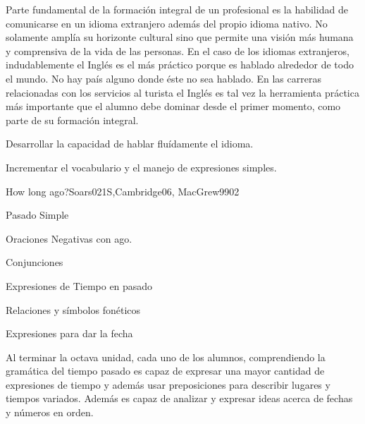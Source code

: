 \begin{syllabus}


\begin{justification}
Parte fundamental de la formación integral de un profesional es la habilidad de 
comunicarse en un idioma extranjero además del propio idioma nativo. No solamente 
amplía su horizonte cultural sino que permite una visión más humana y comprensiva 
de la vida de las personas. En el caso de los idiomas extranjeros, indudablemente 
el Inglés es el más práctico porque es hablado alrededor de todo el mundo. No hay 
país alguno donde éste no sea hablado. En las carreras relacionadas con los 
servicios al turista el Inglés es tal vez la herramienta práctica más importante 
que el alumno debe dominar desde el primer momento, como parte de su formación 
integral.
\end{justification}

\begin{goals}
    \item Desarrollar la capacidad de hablar fluídamente el idioma.
    \item Incrementar el vocabulario y el manejo de expresiones simples.
\end{goals}

\begin{outcomes}
    \item {}
\end{outcomes}

\begin{competences}
    \item {}
\end{competences}

\begin{unit}{How long ago?}{}{Soars021S,Cambridge06, MacGrew99}{0}{2}
   \begin{topics}
      \item Pasado Simple
      \item Oraciones Negativas con ago.
      \item Conjunciones
      \item Expresiones de Tiempo en pasado
      \item Relaciones y símbolos fonéticos
      \item Expresiones para dar la fecha
   \end{topics}

   \begin{learningoutcomes}
      \item Al terminar la octava unidad, cada uno de los alumnos, comprendiendo la gramática del tiempo pasado es capaz de expresar una mayor cantidad de expresiones de tiempo y además usar preposiciones para describir lugares y tiempos variados. Además es capaz de analizar y expresar ideas acerca de fechas y números en orden. 
   \end{learningoutcomes}


\end{unit}
\end{syllabus}
